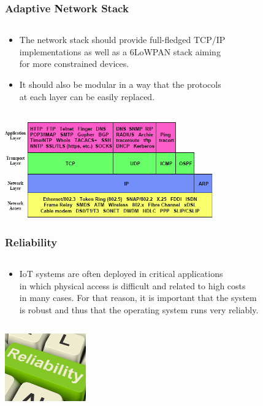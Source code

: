 \documentclass{beamer}
\begin{document}
\begin{frame}
	\frametitle{Adaptive Network Stack}
	\begin{columns}[c]
		\begin{column}{30cm}
			\vspace{.1cm}
			\begin{itemize}
				\justifying
				\item The network stack should provide full-fledged TCP/IP\\
				implementations as well as a 6LoWPAN stack aiming\\
				for more constrained devices.
				\item It should also be modular in a way that the protocols\\
				at each layer can be easily replaced. 
			\end{itemize}
		\end{column}
	\end{columns}
	\vspace{1cm}
	\hspace*{3cm} \includegraphics[width=9cm]{figs/tcp-ip-stack.png}
\end{frame}

\begin{frame}
	\frametitle{Reliability}
	\begin{columns}[c]
		\begin{column}{30cm}
			\vspace{.1cm}
			\begin{itemize}
				\justifying
				\item IoT systems are often deployed in critical applications\\
				in which physical access is difficult and related to high costs\\
				in many cases. For that reason, it is important that the system\\
				is robust and thus that the operating system runs very reliably.
			\end{itemize}
		\end{column}
	\end{columns}
	\vspace{1cm}
	\hspace*{7cm} \includegraphics[width=3.5cm]{figs/reliability.jpg}
\end{frame}
\end{document}
